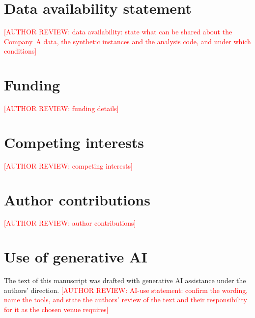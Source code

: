 \documentclass[11pt]{article}
\newcommand{\authorreview}[1]{\textcolor{red}{[AUTHOR REVIEW: #1]}}
\begin{document}
\section*{Data availability statement}
\authorreview{data availability: state what can be shared about the Company~A data, the synthetic instances and the analysis code, and under which conditions}

\section*{Funding}
\authorreview{funding details}

\section*{Competing interests}
\authorreview{competing interests}

\section*{Author contributions}
\authorreview{author contributions}

\section*{Use of generative AI}
The text of this manuscript was drafted with generative AI assistance under the authors' direction. \authorreview{AI-use statement: confirm the wording, name the tools, and state the authors' review of the text and their responsibility for it as the chosen venue requires}



\end{document}

